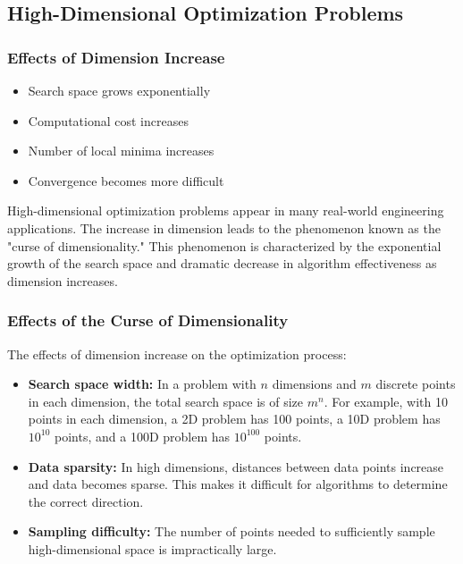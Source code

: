 \subsection{High-Dimensional Optimization Problems}

\subsubsection{Effects of Dimension Increase}
\begin{itemize}
    \item Search space grows exponentially
    \item Computational cost increases
    \item Number of local minima increases
    \item Convergence becomes more difficult
\end{itemize}

High-dimensional optimization problems appear in many real-world engineering applications. The increase in dimension leads to the phenomenon known as the "curse of dimensionality." This phenomenon is characterized by the exponential growth of the search space and dramatic decrease in algorithm effectiveness as dimension increases.

\subsubsection{Effects of the Curse of Dimensionality}

The effects of dimension increase on the optimization process:

\begin{itemize}
    \item \textbf{Search space width:} In a problem with $n$ dimensions and $m$ discrete points in each dimension, the total search space is of size $m^n$. For example, with 10 points in each dimension, a 2D problem has 100 points, a 10D problem has $10^{10}$ points, and a 100D problem has $10^{100}$ points.
    
    \item \textbf{Data sparsity:} In high dimensions, distances between data points increase and data becomes sparse. This makes it difficult for algorithms to determine the correct direction.
    
    \item \textbf{Sampling difficulty:} The number of points needed to sufficiently sample high-dimensional space is impractically large.
\end{itemize}

